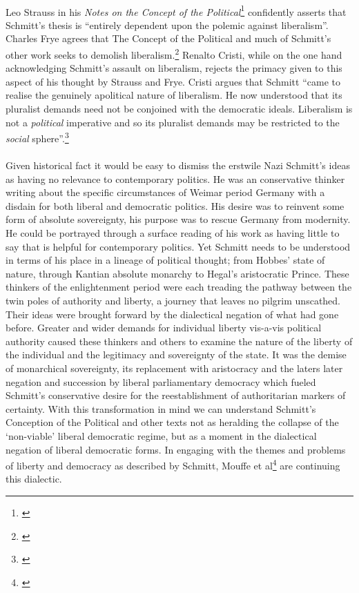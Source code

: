 \documentclass[12pt,a4paper,titlepage]{article}
\begin{document}
\paragraph{}Leo Strauss in his \textit{Notes on the Concept of the Political}\footnote{\cite[Note 3]{Strauss:2007ncp}} confidently asserts that Schmitt's thesis is ``entirely dependent upon the polemic against liberalism''. Charles Frye agrees that The Concept of the Political and much of Schmitt's other work seeks to demolish liberalism.\footnote{\cite[esp. p.824-6]{Frye1996}} Renalto Cristi, while on the one hand acknowledging Schmitt's assault on liberalism, rejects the primacy given to this aspect of his thought by Strauss and Frye. Cristi argues that Schmitt ``came to realise the genuinely apolitical nature of liberalism. He now understood that its pluralist demands need not be conjoined with the democratic ideals. Liberalism is not a \emph{political} imperative and so its pluralist demands may be restricted to the \emph{social} sphere''.\footnote{\cite[p.296, orig. emph.]{cristi1993ldc}}

\paragraph{}Given historical fact it would be easy to dismiss the erstwile Nazi Schmitt's ideas as having no relevance to contemporary politics. He was an conservative thinker writing about the specific circumstances of Weimar period Germany with a disdain for both liberal and democratic politics. His desire was to reinvent some form of absolute sovereignty, his purpose was to rescue Germany from modernity. He could be portrayed through a surface reading of his work as having little to say that is helpful for contemporary politics. Yet Schmitt needs to be understood in terms of his place in a lineage of political thought; from Hobbes' state of nature, through Kantian absolute monarchy to Hegal's aristocratic Prince. These thinkers of the enlightenment period were each treading the pathway between the twin poles of authority and liberty, a journey that leaves no pilgrim unscathed. Their ideas were brought forward by the dialectical negation of what had gone before. Greater and wider demands for individual liberty vis-a-vis political authority caused these thinkers and others to examine the nature of the liberty of the individual and the legitimacy and sovereignty of the state. It was the demise of monarchical sovereignty, its replacement with aristocracy and the laters later negation and succession by liberal parliamentary democracy which fueled Schmitt's conservative desire for the reestablishment of authoritarian markers of certainty. With this transformation in mind we can understand Schmitt's Conception of the Political and other texts not as heralding the collapse of the `non-viable' liberal democratic regime, but as a moment in the dialectical negation of liberal democratic forms. In engaging with the themes and problems of liberty and democracy as described by Schmitt, Mouffe et al\footnote{\cite{Mouffe:1999}} are continuing this dialectic.
\end{document}
